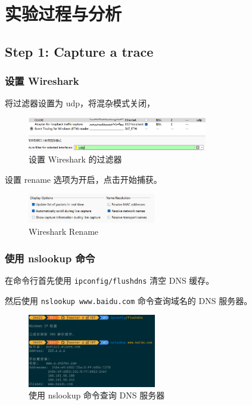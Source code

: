 \documentclass[14pt,a4paper,UTF8,twoside]{article}
\begin{document}
\section{实验过程与分析}

\subsection{Step 1: Capture a trace}

\subsubsection{设置 Wireshark}

将过滤器设置为 udp，将混杂模式关闭，

\begin{figure} [H]
    \centering
    \includegraphics[width=0.7\textwidth]{lab5/udpsetting.png}
    \caption{设置 Wireshark 的过滤器}
\end{figure}

设置 rename 选项为开启，点击开始捕获。

\begin{figure}[H]
  \centering
  \includegraphics[width=0.5\textwidth]{lab5/rename.png}
  \caption{Wireshark Rename}
\end{figure}

\subsubsection{使用 nslookup 命令}

在命令行首先使用 \texttt{ipconfig/flushdns} 清空 DNS 缓存。

然后使用 \texttt{nslookup www.baidu.com} 命令查询域名的 DNS 服务器。

\begin{figure}[H]
    \centering
    \includegraphics[width=0.5\textwidth]{lab5/nslookup.png}
    \caption{使用 nslookup 命令查询 DNS 服务器}
\end{figure}
\end{document}
